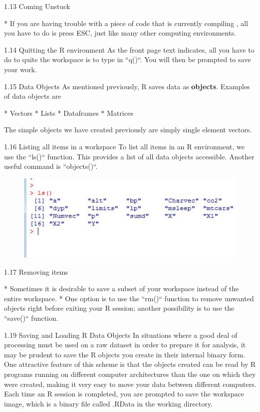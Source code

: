 \documentclass{beamer}
\begin{document}

{1.13 Coming Unstuck}
\Large

*  If you are having trouble with a piece of code that is currently compiling , all you have to do is press ESC, just like many other computing environments.
  


{1.14 Quitting the R environment}
As the front page text indicates, all you have to do to quite the workspace is to type in ``q()``.
You will then be prompted to save your work.


{1.15 Data Objects}
As mentioned previously, R saves data as \textbf{objects}. Examples of data objects are

* Vectors
* Lists
* Dataframes
* Matrices

The simple objects we have created previously are simply single element vectors.


{1.16 Listing all items in a workspace}
To list all items in an R environment, we use the ``ls()`` function. This provides a list of all data
objects accessible. Another useful command is ``objects()``.
\begin{figure}
\centering
\includegraphics[width=1.2\linewidth]{images/ObjectsList}
\end{figure}



{1.17 Removing items}

* Sometimes it is desirable to save a subset of your workspace instead of the entire workspace.
* One option is to use the ``rm()`` function to remove unwanted objects right before exiting your R
session; another possibility is to use the ``save()`` function.




 

{1.19 Saving and Loading R Data Objects}
In situations where a good deal of processing must be used on a raw dataset in order to prepare
it for analysis, it may be prudent to save the R objects you create in their internal binary form.
One attractive feature of this scheme is that the objects created can be read by R programs
running on different computer architectures than the one on which they were created, making it
very easy to move your data between different computers. Each time an R session is completed,
you are prompted to save the workspace image, which is a binary file called .RData in the
working directory.
\end{document}
